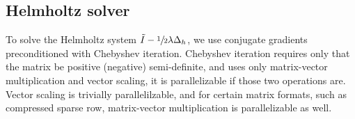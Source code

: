 \subsection{Helmholtz solver}

To solve the Helmholtz system $\tilde{I}-\sfrac12\lambda\Delta_h$, we use
conjugate gradients preconditioned with Chebyshev iteration. Chebyshev
iteration requires only that the matrix be positive (negative) semi-definite,
and uses only matrix-vector multiplication and vector scaling, it is
parallelizable if those two operations are. Vector scaling is trivially
parallelilzable, and for certain matrix formats, such as compressed sparse row,
matrix-vector multiplication is parallelizable as well.
